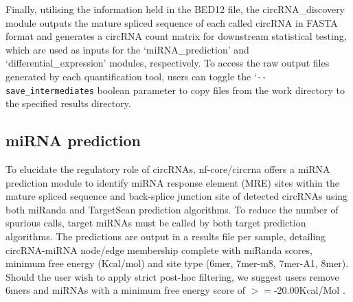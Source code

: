 \documentclass{bmcart}
\begin{document}
\par
Finally, utilising the information held in the BED12 file, the circRNA\_discovery module outputs the mature spliced sequence of each called circRNA in FASTA format and generates a circRNA count matrix for downstream statistical testing, which are used as inputs for the `miRNA\_prediction' and `differential\_expression' modules, respectively. To access the raw output files generated by each quantification tool, users can toggle the `\texttt{-{}-save\_intermediates} boolean parameter to copy files from the work directory to the specified results directory.
\par

\subsection*{\textbf{miRNA prediction}}
To elucidate the regulatory role of circRNAs, nf-core/circrna offers a miRNA prediction module to identify miRNA response element (MRE) sites within the mature spliced sequence and back-splice junction site of detected circRNAs using both miRanda \cite{miRanda} and TargetScan \cite{Targetscan} prediction algorithms. To reduce the number of spurious calls, target miRNAs must be called by both target prediction algorithms. The predictions are output in a results file per sample, detailing circRNA-miRNA node/edge membership complete with miRanda scores, minimum free energy (Kcal/mol) and site type (6mer, 7mer-m8, 7mer-A1, 8mer). Should the user wish to apply strict post-hoc filtering, we suggest users remove 6mers and miRNAs with a minimum free energy score of $>=$-20.00Kcal/Mol \cite{mfe-filter}.
\end{document}
